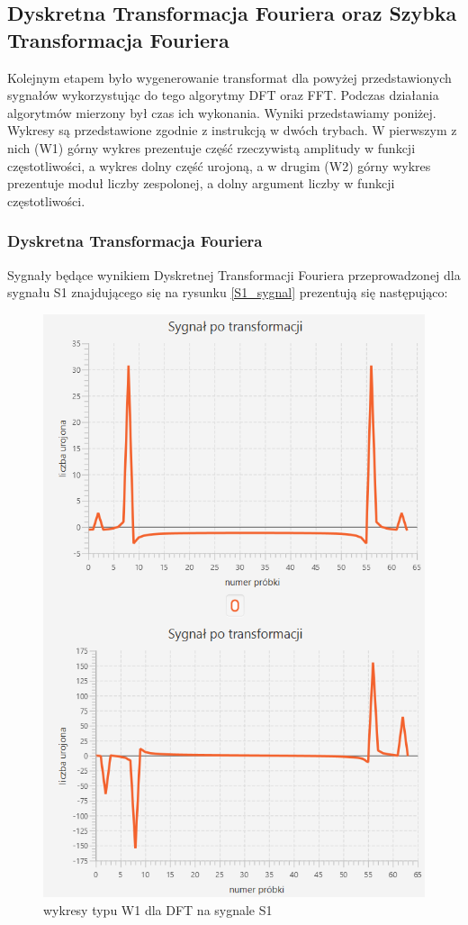 \documentclass[12pt]{article}
\begin{document}
\subsection{Dyskretna Transformacja Fouriera oraz Szybka Transformacja Fouriera}
Kolejnym etapem było wygenerowanie transformat dla powyżej przedstawionych sygnałów wykorzystując do tego algorytmy DFT oraz FFT. Podczas działania algorytmów mierzony był czas ich wykonania. Wyniki przedstawiamy poniżej. Wykresy są przedstawione zgodnie z instrukcją w dwóch trybach. W pierwszym z nich (W1) górny wykres prezentuje część rzeczywistą amplitudy w funkcji częstotliwości, a wykres dolny część urojoną, a w drugim (W2) górny wykres prezentuje moduł liczby zespolonej, a dolny argument liczby w funkcji częstotliwości.

\subsubsection{Dyskretna Transformacja Fouriera}
Sygnały będące wynikiem Dyskretnej Transformacji Fouriera przeprowadzonej dla sygnału S1 znajdującego się na rysunku \ref{S1_sygnal} prezentują się następująco:
\begin{figure}[H]
	\centering
	\includegraphics[width=\linewidth]{S1_DFT_W1.png}
	\caption{wykresy typu W1 dla DFT na sygnale S1}
	\label{S1_DFT_W1}
\end{figure}
\end{document}
